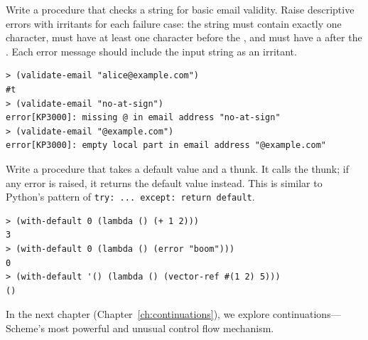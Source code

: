 \begin{exercise}
Write a  procedure that checks a string for basic email validity. Raise descriptive errors with irritants for each failure case: the string must contain exactly one  character, must have at least one character before the , and must have a  after the . Each error message should include the input string as an irritant.

\begin{lstlisting}[style=repl]
> (validate-email "alice@example.com")
#t
> (validate-email "no-at-sign")
error[KP3000]: missing @ in email address "no-at-sign"
> (validate-email "@example.com")
error[KP3000]: empty local part in email address "@example.com"
\end{lstlisting}
\end{exercise}

\begin{exercise}
Write a  procedure that takes a default value and a thunk. It calls the thunk; if any error is raised, it returns the default value instead. This is similar to Python's pattern of \texttt{try: ... except: return default}.

\begin{lstlisting}[style=repl]
> (with-default 0 (lambda () (+ 1 2)))
3
> (with-default 0 (lambda () (error "boom")))
0
> (with-default '() (lambda () (vector-ref #(1 2) 5)))
()
\end{lstlisting}
\end{exercise}

In the next chapter (Chapter~\ref{ch:continuations}), we explore continuations---Scheme's most powerful and unusual control flow mechanism.

\chapterend
